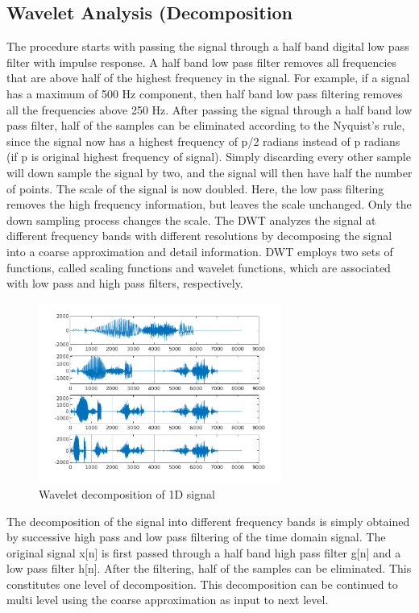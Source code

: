 \documentclass[a4paper,12pt]{article}
\begin{document}
\subsection{Wavelet Analysis (Decomposition}
The procedure starts with passing the signal through a half band digital low pass filter with impulse response. A half band low pass filter removes all frequencies that are above half of the highest frequency in the signal. For example, if a signal has a maximum of 500 Hz component, then half band low pass filtering removes all the frequencies above 250 Hz. After passing the signal through a half band low pass filter, half of the samples can be eliminated according to the Nyquist’s rule, since the signal now has a highest frequency of p/2 radians instead of p radians (if p is original highest frequency of signal). Simply discarding every other sample will down sample the signal by two, and the signal will then have half the number of points. The scale of the signal is now doubled. Here, the low pass filtering removes the high frequency information, but leaves the scale unchanged. Only the down sampling process changes the scale. The DWT analyzes the signal at different frequency bands with different resolutions by decomposing the signal into a coarse approximation and detail information. DWT employs two sets of functions, called scaling functions and wavelet functions, which are associated with low pass and high pass filters, respectively. 


\begin{figure}[t]
        \centering
        \includegraphics[width=8cm]{../Results/demo_1D_deconposition.png}
        \caption{Wavelet decomposition of 1D signal}
		\label{fig:demo2}
\end{figure}

The decomposition of the signal into different frequency bands is simply obtained by successive high pass and low pass filtering of the time domain signal. The original signal x[n] is first passed through a half band high pass filter g[n] and a low pass filter h[n]. After the filtering, half of the samples can be eliminated. This constitutes one level of decomposition. This decomposition can be continued to multi level using the coarse approximation as input to next level.
\end{document}
